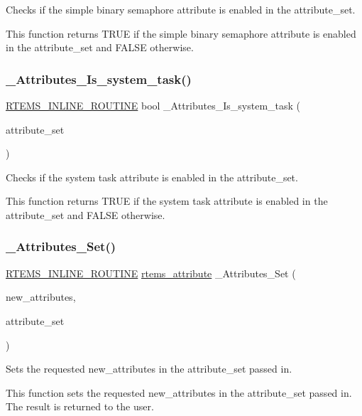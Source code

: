 Checks if the simple binary semaphore attribute is enabled in the attribute\+\_\+set. 

This function returns T\+R\+UE if the simple binary semaphore attribute is enabled in the attribute\+\_\+set and F\+A\+L\+SE otherwise. \mbox{\label{group__ClassicAttributesImpl_ga374b35faccb78aae71b9bf8b72ae0955}} 
\subsubsection{\texorpdfstring{\_Attributes\_Is\_system\_task()}{\_Attributes\_Is\_system\_task()}}
{\footnotesize\ttfamily \mbox{\hyperlink{group__RTEMSScoreBaseDefs_gac216239df231d5dbd15e3520b0b9313f}{R\+T\+E\+M\+S\+\_\+\+I\+N\+L\+I\+N\+E\+\_\+\+R\+O\+U\+T\+I\+NE}} bool \+\_\+\+Attributes\+\_\+\+Is\+\_\+system\+\_\+task (\begin{DoxyParamCaption}\item[{\mbox{\hyperlink{group__ClassicAttributes_gaea40313cf78ed843e09c4315d0a10f79}{rtems\+\_\+attribute}}}]{attribute\+\_\+set }\end{DoxyParamCaption})}



Checks if the system task attribute is enabled in the attribute\+\_\+set. 

This function returns T\+R\+UE if the system task attribute is enabled in the attribute\+\_\+set and F\+A\+L\+SE otherwise. \mbox{\label{group__ClassicAttributesImpl_ga9b9fd8795f6a98817dc0b3dc96b5c770}} 
\subsubsection{\texorpdfstring{\_Attributes\_Set()}{\_Attributes\_Set()}}
{\footnotesize\ttfamily \mbox{\hyperlink{group__RTEMSScoreBaseDefs_gac216239df231d5dbd15e3520b0b9313f}{R\+T\+E\+M\+S\+\_\+\+I\+N\+L\+I\+N\+E\+\_\+\+R\+O\+U\+T\+I\+NE}} \mbox{\hyperlink{group__ClassicAttributes_gaea40313cf78ed843e09c4315d0a10f79}{rtems\+\_\+attribute}} \+\_\+\+Attributes\+\_\+\+Set (\begin{DoxyParamCaption}\item[{\mbox{\hyperlink{group__ClassicAttributes_gaea40313cf78ed843e09c4315d0a10f79}{rtems\+\_\+attribute}}}]{new\+\_\+attributes,  }\item[{\mbox{\hyperlink{group__ClassicAttributes_gaea40313cf78ed843e09c4315d0a10f79}{rtems\+\_\+attribute}}}]{attribute\+\_\+set }\end{DoxyParamCaption})}



Sets the requested new\+\_\+attributes in the attribute\+\_\+set passed in. 

This function sets the requested new\+\_\+attributes in the attribute\+\_\+set passed in. The result is returned to the user. 